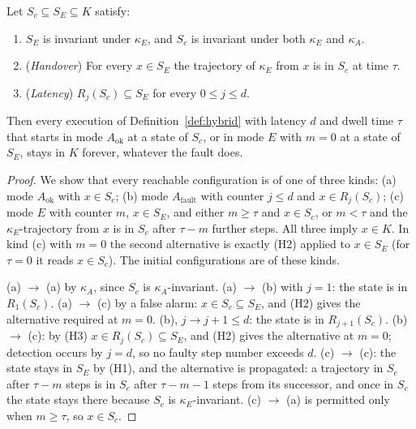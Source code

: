\begin{newresult}\label{thm:relegation}
Let $S_c\subseteq S_E\subseteq K$ satisfy:
\begin{enumerate}[nosep,label=(H\arabic*)]
  \item $S_E$ is invariant under $\kappa_E$, and $S_c$ is invariant under both $\kappa_E$ and $\kappa_A$.
  \item (\emph{Handover}) For every $x\in S_E$ the trajectory of $\kappa_E$ from $x$ is in $S_c$ at time $\tau$.
  \item (\emph{Latency}) $R_j(S_c)\subseteq S_E$ for every $0\le j\le d$.
\end{enumerate}
Then every execution of Definition~\ref{def:hybrid} with latency $d$ and dwell time $\tau$ that starts in mode $A_{\mathrm{ok}}$ at a state of $S_c$, or in mode $E$ with $m=0$ at a state of $S_E$, stays in $K$ forever, whatever the fault does.
\end{newresult}
\begin{proof}
We show that every reachable configuration is of one of three kinds: (a) mode $A_{\mathrm{ok}}$ with $x\in S_c$; (b) mode $A_{\mathrm{fault}}$ with counter $j\le d$ and $x\in R_j(S_c)$; (c) mode $E$ with counter $m$, $x\in S_E$, and either $m\ge\tau$ and $x\in S_c$, or $m<\tau$ and the $\kappa_E$-trajectory from $x$ is in $S_c$ after $\tau-m$ further steps. All three imply $x\in K$. In kind (c) with $m=0$ the second alternative is exactly (H2) applied to $x\in S_E$ (for $\tau=0$ it reads $x\in S_c$). The initial configurations are of these kinds.

(a) $\to$ (a) by $\kappa_A$, since $S_c$ is $\kappa_A$-invariant. (a) $\to$ (b) with $j=1$: the state is in $R_1(S_c)$. (a) $\to$ (c) by a false alarm: $x\in S_c\subseteq S_E$, and (H2) gives the alternative required at $m=0$. (b), $j\to j+1\le d$: the state is in $R_{j+1}(S_c)$. (b) $\to$ (c): by (H3) $x\in R_j(S_c)\subseteq S_E$, and (H2) gives the alternative at $m=0$; detection occurs by $j=d$, so no faulty step number exceeds $d$. (c) $\to$ (c): the state stays in $S_E$ by (H1), and the alternative is propagated: a trajectory in $S_c$ after $\tau-m$ steps is in $S_c$ after $\tau-m-1$ steps from its successor, and once in $S_c$ the state stays there because $S_c$ is $\kappa_E$-invariant. (c) $\to$ (a) is permitted only when $m\ge\tau$, so $x\in S_c$.
\end{proof}

